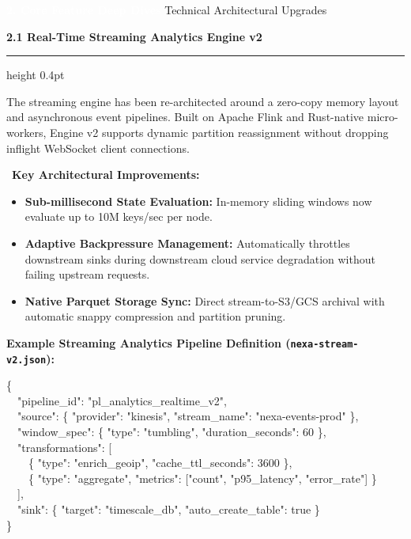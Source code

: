 \documentclass[10pt,a4paper]{article}
\newcommand{\sectionTitle}[2]{%
  \vspace{7pt}
  \begin{tcolorbox}[
    enhanced,
    colback=brandPrimary,
    colframe=brandPrimary,
    arc=3pt,
    left=8pt, right=8pt, top=4pt, bottom=4pt,
    boxrule=0pt
  ]
    \textcolor{white}{\large\bfseries #1} \hfill \textcolor{brandAccentLight}{\small\sffamily #2}
  \end{tcolorbox}
  \vspace{1pt}
}
\newcommand{\subsectionTitle}[1]{%
  \vspace{5pt}
  {\normalsize\bfseries\textcolor{brandDark}{#1}}
  \vspace{1pt}
  \hrule height 0.4pt \color{neutralBorder}
  \vspace{3pt}
}
\begin{document}
\vspace{4pt}

\sectionTitle{2. Core Feature Deep Dives}{Technical Architectural Upgrades}

\subsectionTitle{2.1 Real-Time Streaming Analytics Engine v2}
The streaming engine has been re-architected around a zero-copy memory layout and asynchronous event pipelines. Built on Apache Flink and Rust-native micro-workers, Engine v2 supports dynamic partition reassignment without dropping inflight WebSocket client connections.

\begin{tcolorbox}[infobox]
  \begin{minipage}{\textwidth}
    \textcolor{brandAccent}{\faInfoCircle\ \bfseries Key Architectural Improvements:}
    \begin{itemize}[leftmargin=16pt, topsep=1pt, itemsep=1pt]
      \item \textbf{Sub-millisecond State Evaluation:} In-memory sliding windows now evaluate up to 10M keys/sec per node.
      \item \textbf{Adaptive Backpressure Management:} Automatically throttles downstream sinks during downstream cloud service degradation without failing upstream requests.
      \item \textbf{Native Parquet Storage Sync:} Direct stream-to-S3/GCS archival with automatic snappy compression and partition pruning.
    \end{itemize}
  \end{minipage}
\end{tcolorbox}

\vspace{2pt}
\noindent\textcolor{textMuted}{\small\bfseries Example Streaming Analytics Pipeline Definition (\texttt{nexa-stream-v2.json}):}
\begin{tcolorbox}[codebox]
\{ \\
\ \ "pipeline\_id": "pl\_analytics\_realtime\_v2", \\
\ \ "source": \{ "provider": "kinesis", "stream\_name": "nexa-events-prod" \}, \\
\ \ "window\_spec": \{ "type": "tumbling", "duration\_seconds": 60 \}, \\
\ \ "transformations": [ \\
\ \ \ \ \{ "type": "enrich\_geoip", "cache\_ttl\_seconds": 3600 \}, \\
\ \ \ \ \{ "type": "aggregate", "metrics": ["count", "p95\_latency", "error\_rate"] \} \\
\ \ ], \\
\ \ "sink": \{ "target": "timescale\_db", "auto\_create\_table": true \} \\
\}
\end{tcolorbox}
\end{document}

